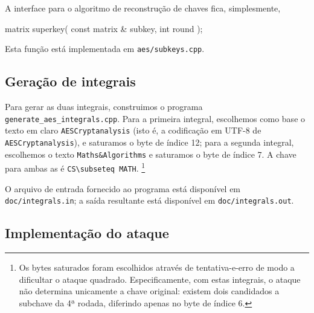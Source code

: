 \documentclass{article}
\begin{document}
A interface para o algoritmo de reconstrução de chaves fica, simplesmente,
\begin{cppcode}
    matrix superkey( const matrix & subkey, int round );
\end{cppcode}
Esta função está implementada em \verb"aes/subkeys.cpp".

\subsection{Geração de integrais}

Para gerar as duas integrais, construimos o programa \verb"generate_aes_integrals.cpp".
Para a primeira integral, escolhemos como base o texto em claro
\verb"AESCryptanalysis"
(isto é, a codificação em UTF-8 de \verb"AESCryptanalysis"),
e saturamos o byte de índice 12;
para a segunda integral, escolhemos o texto \verb"Maths&Algorithms"
e saturamos o byte de índice 7.
A chave para ambas as é \verb"CS\subseteq MATH".
\footnote{
    Os bytes saturados foram escolhidos através de tentativa-e-erro
    de modo a dificultar o ataque quadrado.
    Especificamente,
    com estas integrais,
    o ataque não determina unicamente a chave original:
    existem dois candidados a subchave da 4ª rodada,
    diferindo apenas no byte de índice 6.
}

O arquivo de entrada fornecido ao programa está disponível em
\verb"doc/integrals.in";
a saída resultante está disponível em \verb"doc/integrals.out".

\subsection{Implementação do ataque}
\end{document}
